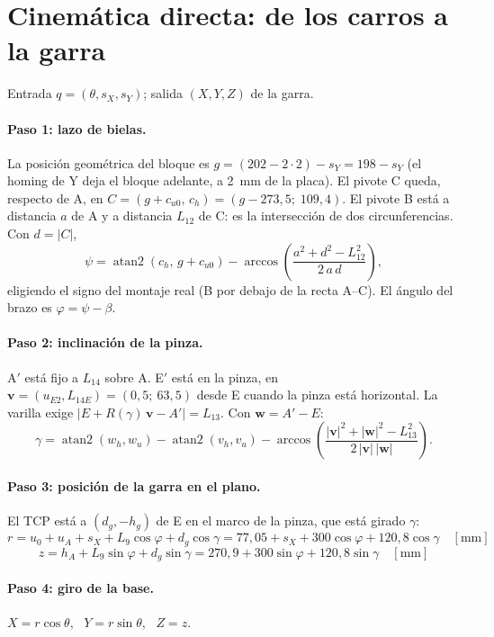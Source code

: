 \section{Cinemática directa: de los carros a la garra}
Entrada $q = (\theta, s_X, s_Y)$; salida $(X, Y, Z)$ de la garra.

\paragraph{Paso 1: lazo de bielas.} La posición geométrica del bloque es $g = (202 - 2\cdot 2) - s_Y = 198 - s_Y$ (el homing de Y deja el bloque adelante, a 2~mm de la placa). El pivote C queda, respecto de A, en $C = (g + c_{u0},\, c_h) = (g - 273{,}5;\; 109{,}4)$. El pivote B está a distancia $a$ de A y a distancia $L_{12}$ de C: es la intersección de dos circunferencias. Con $d = |C|$,
\[
\psi = \operatorname{atan2}(c_h,\, g + c_{u0}) - \arccos\!\left(\frac{a^2 + d^2 - L_{12}^2}{2\,a\,d}\right),
\]
eligiendo el signo del montaje real (B por debajo de la recta A--C). El ángulo del brazo es $\varphi = \psi - \beta$.

\paragraph{Paso 2: inclinación de la pinza.} A$'$ está fijo a $L_{14}$ sobre A. E$'$ está en la pinza, en $\mathbf{v} = (u_{E2}, L_{14E}) = (0{,}5;\ 63{,}5)$ desde E cuando la pinza está horizontal. La varilla exige $|E + R(\gamma)\,\mathbf{v} - A'| = L_{13}$. Con $\mathbf{w} = A' - E$:
\[
\gamma = \operatorname{atan2}(w_h, w_u) - \operatorname{atan2}(v_h, v_u) - \arccos\!\left(\frac{|\mathbf{v}|^2 + |\mathbf{w}|^2 - L_{13}^2}{2\,|\mathbf{v}|\,|\mathbf{w}|}\right).
\]

\paragraph{Paso 3: posición de la garra en el plano.} El TCP está a $(d_g, -h_g)$ de E en el marco de la pinza, que está girado $\gamma$:
\[
r = u_0 + u_A + s_X + L_9\cos\varphi + d_g\cos\gamma = 77{,}05 + s_X + 300\cos\varphi + 120{,}8\cos\gamma \quad [\text{mm}]
\]
\[
z = h_A + L_9\sin\varphi + d_g\sin\gamma = 270{,}9 + 300\sin\varphi + 120{,}8\sin\gamma \quad [\text{mm}]
\]

\paragraph{Paso 4: giro de la base.} $X = r\cos\theta$, \ $Y = r\sin\theta$, \ $Z = z$.

